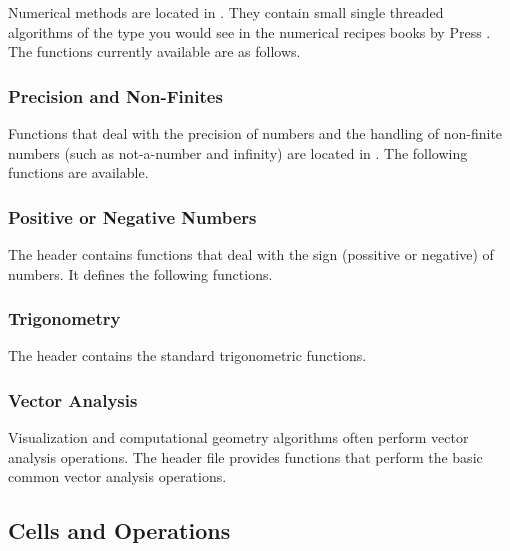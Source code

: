 Numerical methods are located in . They
contain small single threaded algorithms of the type you would see in the
numerical recipes books by Press \etal{}. The functions
currently available are as follows.

\subsubsection{Precision and Non-Finites}

Functions that deal with the precision of numbers and the handling of
non-finite numbers (such as not-a-number and infinity) are located in
. The following functions are available.

\subsubsection{Positive or Negative Numbers}

The  header contains functions that deal with
the sign (possitive or negative) of numbers. It defines the following
functions.

\subsubsection{Trigonometry}

The  header contains the standard trigonometric
functions.

\subsubsection{Vector Analysis}

Visualization and computational geometry algorithms often perform vector
analysis operations. The  header file
provides functions that perform the basic common vector analysis
operations.


\subsection{Cells and Operations}
\label{sec:CellsAndOperations}

 \\
 \\
 \\

